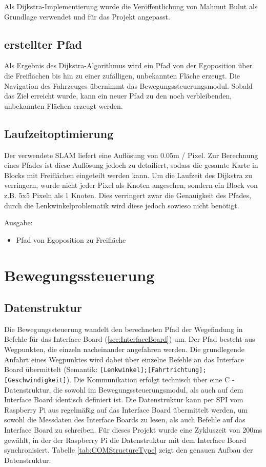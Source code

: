 Als Dijkstra-Implementierung wurde die \href{https://gist.github.com/vertexclique/7410577}{Veröffentlichung von Mahmut Bulut} als Grundlage verwendet und für das Projekt angepasst.



\subsection{erstellter Pfad}

Als Ergebnis des Dijkstra-Algorithmus wird ein Pfad von der Egoposition über die Freiflächen bis hin zu einer zufälligen, unbekannten Fläche erzeugt. Die Navigation des Fahrzeuges übernimmt das Bewegungssteuerungsmodul. Sobald das Ziel erreicht wurde, kann ein neuer Pfad zu den noch verbleibenden, unbekannten Flächen erzeugt werden.


\subsection{Laufzeitoptimierung}

Der verwendete SLAM liefert eine Auflösung von 0.05m / Pixel. Zur Berechnung eines Pfades ist diese Auflösung jedoch zu detailiert, sodass die gesamte Karte in Blocks mit Freiflächen eingeteilt werden kann. Um die Laufzeit des Dijkstra zu verringern, wurde nicht jeder Pixel als Knoten angesehen, sondern ein Block von z.B. 5x5 Pixeln als 1 Knoten. Dies verringert zwar die Genauigkeit des Pfades, durch die Lenkwinkelproblematik wird diese jedoch sowieso nicht benötigt.

Ausgabe:
\begin{itemize}
\item Pfad von Egoposition zu Freifläche
\end{itemize}







\section{Bewegungssteuerung}
\subsection{Datenstruktur}
Die Bewegungssteuerung wandelt den berechneten Pfad der Wegefindung in Befehle für das Interface Board (\ref{sec:InterfaceBoard}) um. Der Pfad besteht aus Wegpunkten, die einzeln nacheinander angefahren werden. Die grundlegende Anfahrt eines Wegpunktes wird dabei über einzelne Befehle an das Interface Board übermittelt (Semantik: \texttt{[Lenkwinkel];[Fahrtrichtung];[Geschwindigkeit]}). Die Kommunikation erfolgt technisch über eine C - Datenstruktur, die sowohl im Bewegungssteuerungsmodul, als auch auf dem Interface Board identisch definiert ist. Die Datenstruktur kann per SPI vom Raspberry Pi aus regelmäßig auf das Interface Board übermittelt werden, um sowohl die Messdaten des Interface Boards zu lesen, als auch Befehle auf das Interface Board zu schreiben. Für dieses Projekt wurde eine Zykluszeit von 200ms gewählt, in der der Raspberry Pi die Datenstruktur mit dem Interface Board synchronisiert. Tabelle \ref{tab:COMStructureType} zeigt den genauen Aufbau der Datenstruktur.

